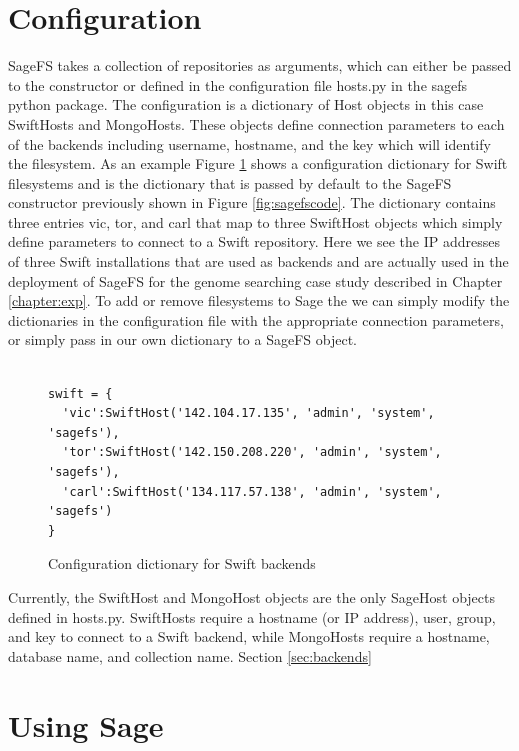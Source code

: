 \section{Configuration}

SageFS takes a collection of repositories as arguments, which can either be
passed to the constructor or defined in the configuration file hosts.py in the
sagefs python package. The configuration is a dictionary of Host objects in
this case SwiftHosts and MongoHosts. These objects define connection
parameters to each of the backends including username, hostname, and the key
which will identify the filesystem. As an example Figure \ref{fig:swiftconfig}
shows a configuration dictionary for Swift filesystems and is the dictionary
that is passed by default to the SageFS constructor previously shown in Figure
\ref{fig:sagefscode}. The dictionary contains three entries vic, tor, and carl that
map to three SwiftHost objects which simply define parameters to connect to a
Swift repository. Here we see the IP addresses of three Swift installations
that are used as backends and are actually used in the deployment of SageFS
for the genome searching case study described in Chapter \ref{chapter:exp}. To
add or remove filesystems to Sage the we can simply modify the dictionaries in
the configuration file with the appropriate connection parameters, or simply
pass in our own dictionary to a SageFS object.


\begin{figure}[h]
\begin{lstlisting}

swift = {
  'vic':SwiftHost('142.104.17.135', 'admin', 'system', 'sagefs'),
  'tor':SwiftHost('142.150.208.220', 'admin', 'system', 'sagefs'),
  'carl':SwiftHost('134.117.57.138', 'admin', 'system', 'sagefs')
}

\end{lstlisting}
\caption{Configuration dictionary for Swift backends}
\label{fig:swiftconfig}
\end{figure}

Currently, the SwiftHost and MongoHost objects are the only SageHost objects
defined in hosts.py. SwiftHosts require a hostname (or IP address), user,
group, and key to connect to a Swift backend, while MongoHosts require a
hostname, database name, and collection name. Section \ref{sec:backends}


\section{Using Sage}

